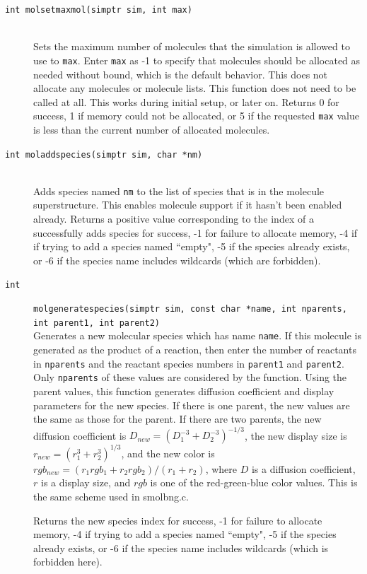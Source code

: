 \documentclass {scrbook}
\newcommand {\ttt} {\texttt}
\begin{document}
\begin{description}
\item[\ttt{int molsetmaxmol(simptr sim, int max)}]
\hfill \\
Sets the maximum number of molecules that the simulation is allowed to use to \ttt{max}. Enter \ttt{max} as -1 to specify that molecules should be allocated as needed without bound, which is the default behavior. This does not allocate any molecules or molecule lists. This function does not need to be called at all. This works during initial setup, or later on. Returns 0 for success, 1 if memory could not be allocated, or 5 if the requested \ttt{max} value is less than the current number of allocated molecules.

\item[\ttt{int moladdspecies(simptr sim, char *nm)}]
\hfill \\
Adds species named \ttt{nm} to the list of species that is in the molecule superstructure. This enables molecule support if it hasn't been enabled already. Returns a positive value corresponding to the index of a successfully adds species for success, -1 for failure to allocate memory, -4 if if trying to add a species named ``empty", -5 if the species already exists, or -6 if the species name includes wildcards (which are forbidden).

\item[\ttt{int}]
\ttt{molgeneratespecies(simptr sim, const char *name, int nparents, int parent1, int parent2)} \\
Generates a new molecular species which has name \ttt{name}. If this molecule is generated as the product of a reaction, then enter the number of reactants in \ttt{nparents} and the reactant species numbers in \ttt{parent1} and \ttt{parent2}. Only \ttt{nparents} of these values are considered by the function. Using the parent values, this function generates diffusion coefficient and display parameters for the new species. If there is one parent, the new values are the same as those for the parent. If there are two parents, the new diffusion coefficient is $D_{new}=(D_1^{-3}+D_2^{-3})^{-1/3}$, the new display size is $r_{new}=(r_1^3+r_2^3)^{1/3}$, and the new color is $rgb_{new}=(r_1rgb_1+r_2rgb_2)/(r_1+r_2)$, where $D$ is a diffusion coefficient, $r$ is a display size, and $rgb$ is one of the red-green-blue color values. This is the same scheme used in smolbng.c.

Returns the new species index for success, -1 for failure to allocate memory, -4 if trying to add a species named ``empty", -5 if the species already exists, or -6 if the species name includes wildcards (which is forbidden here).


\end{description}
\end{document}
